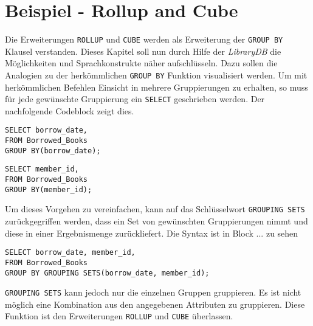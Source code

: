 \section{Beispiel - Rollup and Cube}
Die Erweiterungen \texttt{ROLLUP} und \texttt{CUBE} werden als Erweiterung der \texttt{GROUP
BY} Klausel verstanden. Dieses Kapitel soll nun durch Hilfe der \textit{LibraryDB}
die Möglichkeiten und Sprachkonstrukte näher aufschlüsseln. Dazu sollen die Analogien
zu der herkömmlichen \texttt{GROUP BY} Funktion visualisiert werden. Um mit herkömmlichen
Befehlen Einsicht in mehrere Gruppierungen zu erhalten, so muss für jede
gewünschte Gruppierung ein \texttt{SELECT} geschrieben werden. Der nachfolgende
Codeblock zeigt dies.

\begin{minipage}{0.45\textwidth}
	 \begin{lstlisting}
SELECT borrow_date,
FROM Borrowed_Books
GROUP BY(borrow_date);
	\end{lstlisting}
\end{minipage}
\hfill
\begin{minipage}{0.45\textwidth}
	 \begin{lstlisting}
SELECT member_id,
FROM Borrowed_Books
GROUP BY(member_id);
	\end{lstlisting}
\end{minipage}

Um dieses Vorgehen zu vereinfachen, kann auf das Schlüsselwort \texttt{GROUPING
SETS} zurückgegriffen werden, dass ein Set von gewünschten Gruppierungen nimmt
und diese in einer Ergebnismenge zurückliefert. Die Syntax ist in Block ... zu sehen

\begin{lstlisting}
SELECT borrow_date, member_id,
FROM Borrowed_Books
GROUP BY GROUPING SETS(borrow_date, member_id);
\end{lstlisting}

\texttt{GROUPING SETS} kann jedoch nur die einzelnen Gruppen gruppieren. Es ist nicht
möglich eine Kombination aus den angegebenen Attributen zu gruppieren. Diese
Funktion ist den Erweiterungen \texttt{ROLLUP} und \texttt{CUBE} überlassen.